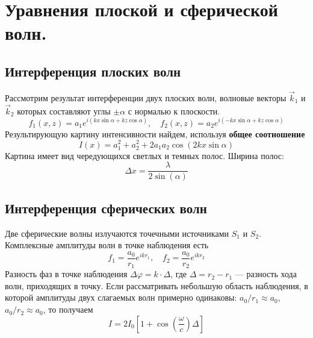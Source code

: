 \documentclass[a4paper, 12pt]{book}
\begin{document}
	\chapter{Уравнения плоской и сферической волн.}
	\section{Интерференция плоских волн}
	Рассмотрим результат интерференции двух плоских волн, волновые векторы $\vec{k}_1$ и $\vec{k}_2$ которых составляют углы $\pm\alpha$ с нормалью к плоскости.
	\begin{equation*}
		f_1\left(x,z\right)=a_1e^{i\left(kx\sin\alpha+kz\cos\alpha\right)},
		\quad
		f_2\left(x,z\right)=a_2e^{i\left(-kx\sin\alpha+kz\cos\alpha\right)}
	\end{equation*}
	Результирующую картину интенсивности найдем, используя \textbf{общее соотношение}
	\begin{equation}
		I\left(x\right)=a_1^2+a_2^2+2a_1a_2\cos\left(2kx\sin\alpha\right)
	\end{equation}
	Картина имеет вид чередующихся светлых и темных полос. Ширина полос:
	\begin{equation}
		\Delta x=\frac{\lambda}{2\sin\left(\alpha\right)}
	\end{equation}
	\section{Интерференция сферических волн}
	Две сферические волны излучаются точечными источниками $S_1$ и $S_2$. Комплексные амплитуды волн в точке наблюдения есть
	\begin{equation*}
		f_1=\frac{a_0}{r_1}e^{ikr_1},\quad f_2=\frac{a_0}{r_2}e^{ikr_2}
	\end{equation*}
	Разность фаз в точке наблюдения $\Delta\varphi=k\cdot\Delta$, где $\Delta=r_2-r_1$ — разность хода волн, приходящих в точку.
	Если рассматривать небольшую область наблюдения, в которой амплитуды двух слагаемых волн примерно одинаковы: $a_0/r_1\approx a_0$, $a_0/r_2\approx a_0$, то получаем
	\begin{equation}
		I=2I_0\left[1+\cos\left(\frac{\omega}{c}\right)\Delta\right]
	\end{equation}
\end{document}
